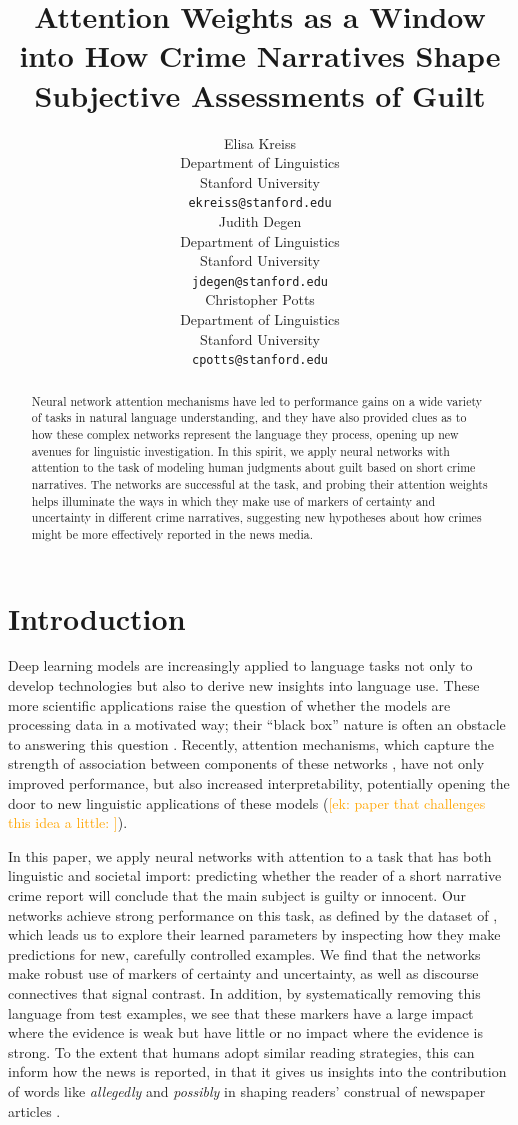 \documentclass[11pt,a4paper]{article}
\title{Attention Weights as a Window into How Crime Narratives Shape Subjective Assessments of Guilt}
\author{Elisa Kreiss \\
  Department of Linguistics \\
  Stanford University \\
  \texttt{ekreiss@stanford.edu} \\\And
  Judith Degen \\
  Department of Linguistics \\
  Stanford University \\
  \texttt{jdegen@stanford.edu} \\\And
  Christopher Potts \\
  Department of Linguistics \\
  Stanford University \\
  \texttt{cpotts@stanford.edu}\\}
\date{}
\newcommand{\ek}[1]{\textcolor{Orange}{[ek: #1]}}
\begin{document}
\maketitle
\begin{abstract}
  Neural network attention mechanisms have led to performance gains on a wide variety of tasks in natural language understanding, and they have also provided clues as to how these complex networks represent the language they process, opening up new avenues for linguistic investigation. In this spirit, we apply neural networks with attention to the task of modeling human judgments about guilt based on short crime narratives. The networks are successful at the task, and probing their attention weights helps illuminate the ways in which they make use of markers of certainty and uncertainty in different crime narratives, suggesting new hypotheses about how crimes might be more effectively reported in the news media.
\end{abstract}

\section{Introduction}


Deep learning models are increasingly applied to language tasks not only to develop technologies but also to derive new insights into language use. These more scientific applications raise the question of whether the models are processing data in a motivated way; their ``black box'' nature is often an obstacle to answering this question \citep{Alishah-etal:2019}. Recently, attention mechanisms, which capture the strength of association between components of these networks \citep{bahdanau2014neural,luong-etal-2015-effective}, have not only improved performance, but also increased interpretability, potentially opening the door to new linguistic applications of these models (\ek{paper that challenges this idea a little: }\cite{Serrano:2019}).

In this paper, we apply neural networks with attention to a task that has both linguistic and societal import: predicting whether the reader of a short narrative crime report will conclude that the main subject is guilty or innocent. Our networks achieve strong performance on this task, as defined by the dataset of \citet{Kreiss:2019}, which leads us to explore their learned parameters by inspecting how they make predictions for new, carefully controlled examples. We find that the networks make robust use of markers of certainty and uncertainty, as well as discourse connectives that signal contrast. In addition, by systematically removing this language from test examples, we see that these markers have a large impact where the evidence is weak but have little or no impact where the evidence is strong. To the extent that humans adopt similar reading strategies, this can inform how the news is reported, in that it gives us insights into the contribution of words like \emph{allegedly} and \emph{possibly} in shaping readers' construal of newspaper articles \citep{Erickson-etal:1978,jensen2008scientific}.
\end{document}
